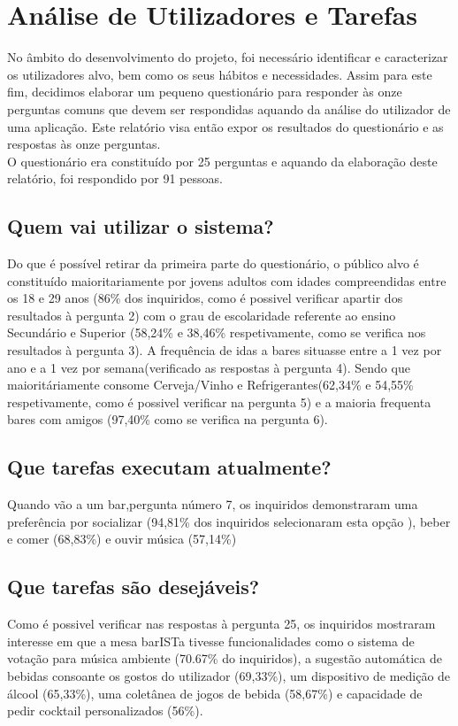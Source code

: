 \documentclass{article}
\begin{document}
\section*{Análise de Utilizadores e Tarefas}

No âmbito do desenvolvimento do projeto, foi necessário identificar e caracterizar os utilizadores alvo, bem como os seus hábitos e necessidades. Assim para este fim, decidimos elaborar um pequeno questionário para responder às onze perguntas comuns que devem ser respondidas aquando da análise do utilizador de uma aplicação. Este relatório visa então expor os resultados do questionário e as respostas às onze perguntas.\\
O questionário era constituído por 25 perguntas e aquando da elaboração deste relatório, foi respondido por 91 pessoas.

\subsection*{Quem vai utilizar o sistema?}
Do que é possível retirar da primeira parte do questionário, o público alvo é constituído maioritariamente por jovens adultos com idades compreendidas entre os 18 e 29 anos (86\% dos inquiridos, como é possivel verificar apartir dos resultados à pergunta 2) com o grau de escolaridade referente ao ensino Secundário e Superior (58,24\% e 38,46\% respetivamente, como se verifica nos resultados à pergunta 3). A frequência de idas a bares situasse entre a 1 vez por ano e a 1 vez por semana(verificado as respostas à pergunta 4). Sendo que maioritáriamente consome Cerveja/Vinho e Refrigerantes(62,34\% e 54,55\% respetivamente, como é possivel verificar na pergunta 5) e a maioria frequenta bares com amigos (97,40\% como se verifica na pergunta 6).
\subsection*{Que tarefas executam atualmente?}
Quando vão a um bar,pergunta número 7, os inquiridos demonstraram uma preferência por socializar (94,81\% dos inquiridos selecionaram esta opção ), beber e comer (68,83\%) e ouvir música (57,14\%)
\subsection*{Que tarefas são desejáveis?}
Como é possivel verificar nas respostas à pergunta 25, os inquiridos mostraram interesse em que a mesa barISTa tivesse funcionalidades como o sistema de votação para música ambiente (70.67\% do inquiridos), a sugestão automática de bebidas consoante os gostos do utilizador (69,33\%), um dispositivo de medição de álcool (65,33\%), uma coletânea de jogos de bebida (58,67\%) e capacidade de pedir cocktail personalizados (56\%).
\end{document}
